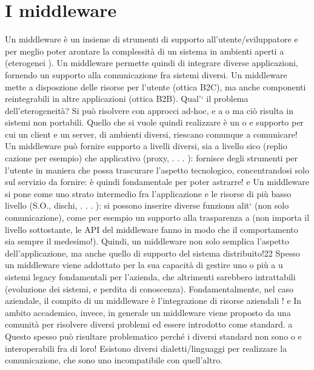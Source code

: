\section{I middleware}
Un middleware è un insieme di strumenti di supporto all'utente/sviluppatore
e
per meglio poter arontare la complessità di un sistema in ambienti aperti
a
(eterogenei ). Un middleware permette quindi di integrare diverse applicazioni,
fornendo un supporto alla comunicazione fra sistemi diversi.
Un middleware mette a disposzione delle risorse per l'utente (ottica B2C),
ma anche componenti reintegrabili in altre applicazioni (ottica B2B).
Qual'` il problema dell'eterogeneità? Si può risolvere con approcci ad-hoc,
e
a
o
ma ciò risulta in sistemi non portabili. Quello che si vuole quindi realizzare è un
o
e
supporto per cui un client e un server, di ambienti diversi, riescano comunque
a comunicare!
Un middleware può fornire supporto a livelli diversi, sia a livello sico (replio
cazione per esempio) che applicativo (proxy, . . . ): fornisce degli strumenti per
l'utente in maniera che possa trascurare l'aspetto tecnologico, concentrandosi
solo sul servizio da fornire: è quindi fondamentale per poter astrarre!
e
Un middleware si pone come uno strato intermedio fra l'applicazione e le
risorse di più basso livello (S.O., dischi, . . . ): si possono inserire diverse funzionu
alit` (non solo comunicazione), come per esempio un supporto alla trasparenza
a
(non importa il livello sottostante, le API del middleware fanno in modo che
il comportamento sia sempre il medesimo!). Quindi, un middleware non solo
semplica l'aspetto dell'applicazione, ma anche quello di supporto del sistema
distribuito!22
Spesso un middleware viene addottato per la sua capacità di gestire uno o più
a
u
sistemi legacy fondamentali per l'azienda, che altrimenti sarebbero intrattabili
(evoluzione dei sistemi, e perdita di conoscenza). Fondamentalmente, nel caso
aziendale, il compito di un middleware è l'integrazione di risorse aziendali !
e
In ambito accademico, invece, in generale un middleware viene proposto da
una comunità per risolvere diversi problemi ed essere introdotto come standard.
a
Questo spesso può risultare problematico perché i diversi standard non sono
o
e
interoperabili fra di loro! Esistono diversi dialetti/linguaggi per realizzare la
comunicazione, che sono uno incompatibile con quell'altro.
